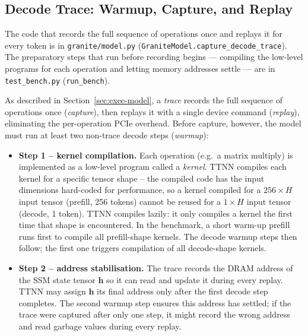 \subsection{Decode Trace: Warmup, Capture, and Replay}
\label{sec:trace-impl-detail}

The code that records the full sequence of operations once and replays it for every token is in \texttt{granite/\allowbreak model.py} (\texttt{GraniteModel.\allowbreak capture\_decode\_trace}). The preparatory steps that run before recording begins --- compiling the low-level programs for each operation and letting memory addresses settle --- are in \texttt{test\_bench.py} (\texttt{run\_bench}).

As described in Section~\ref{sec:exec-model}, a \emph{trace} records the full sequence of operations once (\emph{capture}), then replays it with a single device command (\emph{replay}), eliminating the per-operation PCIe overhead. Before capture, however, the model must run at least two non-trace decode steps (\emph{warmup}):
\begin{itemize}
  \item \textbf{Step 1 -- kernel compilation.} Each operation (e.g.\ a matrix multiply) is implemented as a low-level program called a \emph{kernel}. TTNN compiles each kernel for a specific tensor shape -- the compiled code has the input dimensions hard-coded for performance, so a kernel compiled for a $256{\times}H$ input tensor (prefill, 256 tokens) cannot be reused for a $1{\times}H$ input tensor (decode, 1 token). TTNN compiles lazily: it only compiles a kernel the first time that shape is encountered. In the benchmark, a short warm-up prefill runs first to compile all prefill-shape kernels. The decode warmup steps then follow; the first one triggers compilation of all decode-shape kernels.
  \item \textbf{Step 2 -- address stabilisation.} The trace records the DRAM address of the SSM state tensor $\mathbf{h}$ so it can read and update it during every replay. TTNN may assign $\mathbf{h}$ its final address only after the first decode step completes. The second warmup step ensures this address has settled; if the trace were captured after only one step, it might record the wrong address and read garbage values during every replay.
\end{itemize}


